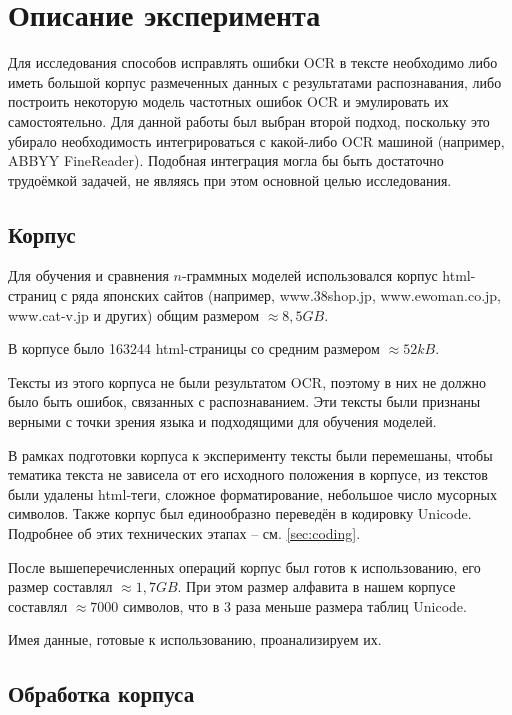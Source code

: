 \section{ Описание эксперимента }\label{sec:experiment}

Для исследования способов исправлять ошибки OCR в тексте необходимо либо иметь большой корпус размеченных данных с результатами распознавания, либо построить некоторую модель частотных ошибок OCR и эмулировать их самостоятельно. Для данной работы был выбран второй подход, поскольку это убирало необходимость интегрироваться с какой-либо OCR машиной (например, ABBYY FineReader). Подобная интеграция могла бы быть достаточно трудоёмкой задачей, не являясь при этом основной целью исследования.

\subsection{ Корпус }

Для обучения и сравнения $n$-граммных моделей использовался корпус html-страниц с ряда японских сайтов (например, www.38shop.jp, www.ewoman.co.jp, www.cat-v.jp и других) общим размером $\approx 8,5 GB$. 

В корпусе было 163244 html-страницы со средним размером $\approx 52 kB$.

Тексты из этого корпуса не были результатом OCR, поэтому в них не должно было быть ошибок, связанных с распознаванием. Эти тексты были признаны верными с точки зрения языка и подходящими для обучения моделей.

В рамках подготовки корпуса к эксперименту тексты были перемешаны, чтобы тематика текста не зависела от его исходного положения в корпусе, из текстов были удалены html-теги, сложное форматирование, небольшое число мусорных символов. Также корпус был единообразно переведён в кодировку Unicode. Подробнее об этих технических этапах -- см. \cref{sec:coding}.

После вышеперечисленных операций корпус был готов к использованию, его размер составлял $\approx 1,7 GB$. При этом размер алфавита в нашем корпусе составлял $\approx 7000$ символов, что в 3 раза меньше размера таблиц Unicode.

Имея данные, готовые к использованию, проанализируем их.

\subsection{ Обработка корпуса }

